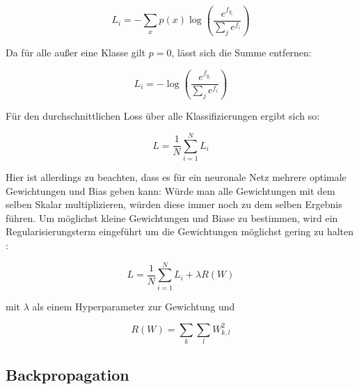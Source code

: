 \begin{equation}
L_i = -\sum_x p(x)\log\left(\dfrac{e^{f_{y_i}}}{\sum_j e^{f_i}}\right)
\end{equation}

Da für alle außer eine Klasse gilt $p=0$, lässt sich die Summe entfernen:

\begin{equation}
L_i = -\log\left(\dfrac{e^{f_{y_i}}}{\sum_j e^{f_i}}\right)
\end{equation}


Für den durchschnittlichen Loss über alle Klassifizierungen ergibt sich so:

\begin{equation}
L = \dfrac{1}{N}\sum_{i=1}^{N}L_i
\end{equation}

Hier ist allerdings zu beachten, dass es für ein neuronale Netz mehrere optimale Gewichtungen und Bias geben kann: Würde man \bspw alle Gewichtungen mit dem selben Skalar multiplizieren, würden diese immer noch zu dem selben Ergebnis führen. Um möglichst kleine Gewichtungen und Biase zu bestimmen, wird ein Regularisierungsterm eingeführt um die Gewichtungen möglichst gering zu halten \cite{cs231n}:

\begin{equation}
L = \dfrac{1}{N}\sum_{i=1}^{N}L_i + \lambda R(W)
\end{equation}

mit $\lambda$ als einem Hyperparameter zur Gewichtung und

\begin{equation}
R(W) = \sum_k\sum_l W^2_{k,l}
\end{equation}

\subsection{Backpropagation}
\label{ssec:backpropagation}
